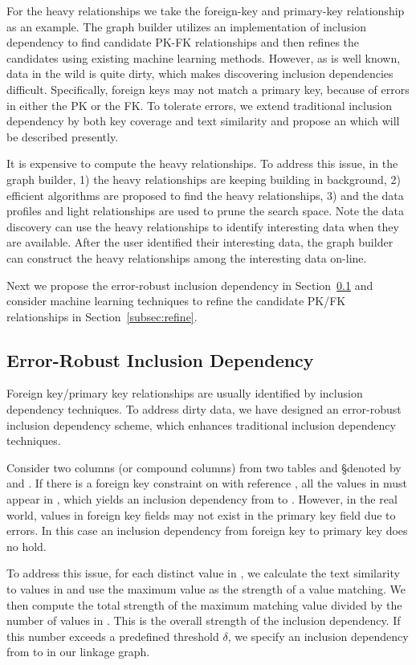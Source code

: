 For the heavy relationships we take the foreign-key and primary-key relationship as an example. The graph builder utilizes an implementation of inclusion dependency to find candidate PK-FK relationships and then refines the candidates using existing machine learning methods. However, as is well known, data in the wild is quite dirty, which makes discovering inclusion dependencies difficult. Specifically, foreign keys may not match a primary key, because of errors in either the PK or the FK. To tolerate errors, we extend traditional inclusion dependency by both key coverage and text similarity and propose an \emph{\eind} which will be described presently.


It is expensive to compute the heavy relationships. To address this issue, in the graph builder, 1) the heavy relationships are keeping building in background, 2) efficient algorithms are proposed to find the heavy relationships, 3) and the data profiles and light relationships are used to prune the search space. Note the data discovery can use the heavy relationships to identify interesting data when they are available. After the user identified their interesting data, the graph builder can construct the heavy relationships among the interesting data on-line.


Next we propose the error-robust inclusion dependency in Section~\ref{subsec:eind} and consider machine learning techniques to refine the candidate PK/FK relationships in Section~\ref{subsec:refine}.


\subsection{Error-Robust Inclusion Dependency}\label{subsec:eind}

Foreign key/primary key relationships are usually identified by inclusion dependency techniques. To address dirty data, we have designed an error-robust inclusion dependency scheme, which enhances traditional inclusion dependency techniques.

Consider two columns (or compound columns) from two tables \R and \S denoted by \RX and \SY. If there is a foreign key constraint on \RX with reference \SY, all the values in \RX must appear in \SY, which yields an inclusion dependency from \RX to \SY. However, in the real world, values in foreign key fields may not exist in the primary key field due to errors.  In this case an inclusion dependency from foreign key to primary key does no hold. 

To address this issue, for each distinct value in \RX, we calculate the text similarity to values in \SY and use the maximum value as the strength of a value matching. We then compute the total strength of the maximum matching value divided by the number of values in \RX. This is the overall strength of the inclusion dependency.  If this number exceeds a predefined threshold $\delta$, we specify an inclusion dependency from \RX to \SY in our linkage graph. 

